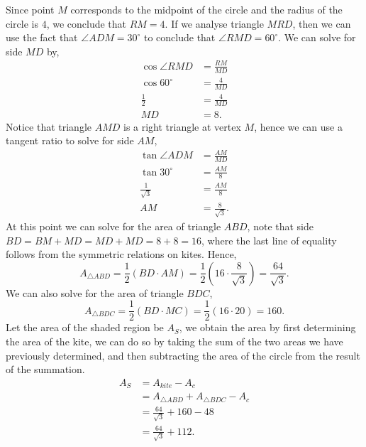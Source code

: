 \documentclass[12pt]{article} %
\begin{document}
\begin{qstn}
\begin{center}
      \end{center}

      \newpage
  
      \begin{solution}
        Since point $M$ corresponds to the midpoint of the circle and the radius of the circle is $4$, we conclude
        that $RM = 4$. If we analyse triangle  $MRD$, then we can use the fact that $\angle ADM = 30^{\circ}$ to
        conclude that $\angle RMD = 60^{\circ}$. We can solve for side $MD$ by,
        \begin{align*}
          \cos \angle RMD &= \frac{RM}{MD}\\
          \cos 60^{\circ} &= \frac{4}{MD}\\
          \frac{1}{2} &= \frac{4}{MD}\\
          MD &= 8
        .\end{align*}
        Notice that triangle $AMD$ is a right triangle at vertex  $M$, hence we can use a tangent ratio to solve
        for side  $AM$,
         \begin{align*}
           \tan \angle ADM &= \frac{AM}{MD}\\
           \tan 30^{\circ} &= \frac{AM}{8}\\
           \frac{1}{\sqrt{3}} &= \frac{AM}{8}\\
           AM &= \frac{8}{\sqrt{3}}
        .\end{align*}
        At this point we can solve for the area of triangle $ABD$, note that side  $BD = BM + MD = MD + MD = 8 + 8
        = 16$, where the last line of equality follows from the symmetric relations on kites. Hence,
         \[
            A_{\triangle ABD} = \frac{1}{2}\left( BD \cdot AM \right) = \frac{1}{2}\left( 16\cdot \frac{8}{\sqrt{3} } \right)
                               = \frac{64}{\sqrt{3}}
        .\] 
        We can also solve for the area of triangle $BDC$,
        \[
            A_{\triangle BDC} = \frac{1}{2}\left( BD \cdot MC \right)  = \frac{1}{2}\left( 16\cdot 20 \right) 
                              = 160
        .\] 
        Let the area of the shaded region be $A_S$, we obtain the area by first determining the area of the
        kite, we can do so by taking the sum of the two areas we have previously
        determined, and then subtracting the area of the circle from the result of the summation.
        \begin{align*}
          A_S &= A_{kite} - A_c\\
              &= A_{\triangle ABD} + A_{\triangle BDC} - A_c\\
              &= \frac{64}{\sqrt{3}} + 160 - 48\\
              &= \frac{64}{\sqrt{3}} + 112
        .\end{align*}
      \end{solution}
\end{qstn}
\end{document}
